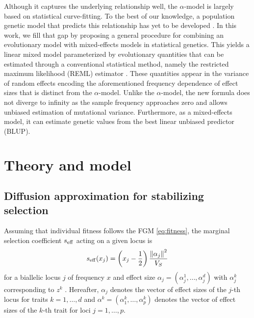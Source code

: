 \documentclass[10pt]{article}
\begin{document}
Although it captures the underlying relationship well, the $\alpha$-model is largely based on statistical curve-fitting. To the best of our knowledge, a population genetic model that predicts this relationship has yet to be developed \citep{Sella_2019,Koch_2021}.
In this work, we fill that gap by proposing a general procedure for combining an evolutionary model with mixed-effects models in statistical genetics. 
This yields a linear mixed model parameterized by evolutionary quantities that can be estimated through a conventional statistical method, namely the restricted maximum likelihood (REML) estimator \citep{Johnson_1995}.
These quantities appear in the variance of random effects encoding the aforementioned frequency dependence of effect sizes that is distinct from the $\alpha$-model.
Unlike the $\alpha$-model, the new formula does not diverge to infinity as the sample frequency approaches zero and allows unbiased estimation of mutational variance.
Furthermore, as a mixed-effects model, it can estimate genetic values from the best linear unbiased predictor (BLUP).

\section{Theory and model}

\subsection{Diffusion approximation for stabilizing selection}
Assuming that individual fitness follows the FGM \eqref{eq:fitness},
the marginal selection coefficient $s_{\mathrm{eff}}$ acting on a given locus is
\begin{align} \label{eq:seff}
    s_{\mathrm{eff}}(x_j) = \left(x_j-\frac{1}{2}\right)\frac{\left\| \alpha_j \right\|^2}{V_S}
\end{align}
for a biallelic locus $j$ of frequency $x$ and effect size $\alpha_j=(\alpha_j^1, \ldots, \alpha_j^d)$ with $\alpha_j^k$ corresponding to $z^k$ \citep{Robertson1956againstextreme,Lande1976phenoevolution,Simons2018popgeninterpretation, Negm_2026}.
Hereafter, $\alpha_j$ denotes the vector of effect sizes of the $j$-th locus for traits $k=1,\ldots,d$ and $\alpha^k=(\alpha_1^k, \ldots, \alpha_p^k)$ denotes the vector of effect sizes of the $k$-th trait for loci $j=1, \ldots, p$.
\end{document}
